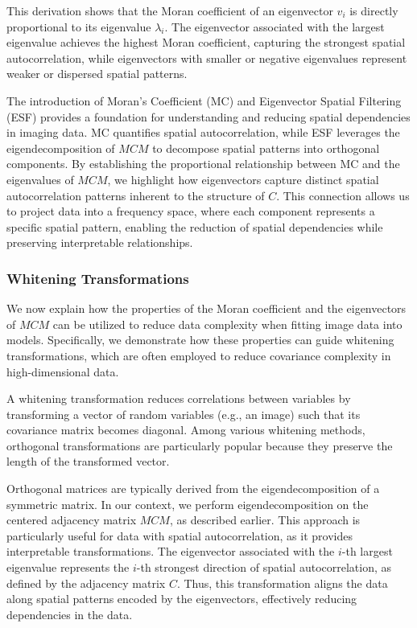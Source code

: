 \documentclass[12pt]{article}
\begin{document}
This derivation shows that the Moran coefficient of an eigenvector \( v_i \) is directly proportional to its eigenvalue \( \lambda_i \). The eigenvector associated with the largest eigenvalue achieves the highest Moran coefficient, capturing the strongest spatial autocorrelation, while eigenvectors with smaller or negative eigenvalues represent weaker or dispersed spatial patterns.

The introduction of Moran’s Coefficient (MC) and Eigenvector Spatial Filtering (ESF) provides a foundation for understanding and reducing spatial dependencies in imaging data. MC quantifies spatial autocorrelation, while ESF leverages the eigendecomposition of \( MCM \) to decompose spatial patterns into orthogonal components. By establishing the proportional relationship between MC and the eigenvalues of \( MCM \), we highlight how eigenvectors capture distinct spatial autocorrelation patterns inherent to the structure of \( C \). This connection allows us to project data into a frequency space, where each component represents a specific spatial pattern, enabling the reduction of spatial dependencies while preserving interpretable relationships.



\subsubsection{Whitening Transformations}

We now explain how the properties of the Moran coefficient and the eigenvectors of \( MCM \) can be utilized to reduce data complexity when fitting image data into models. Specifically, we demonstrate how these properties can guide whitening transformations, which are often employed to reduce covariance complexity in high-dimensional data.

A whitening transformation reduces correlations between variables by transforming a vector of random variables (e.g., an image) such that its covariance matrix becomes diagonal. Among various whitening methods, orthogonal transformations are particularly popular because they preserve the length of the transformed vector.

Orthogonal matrices are typically derived from the eigendecomposition of a symmetric matrix. In our context, we perform eigendecomposition on the centered adjacency matrix \( MCM \), as described earlier. This approach is particularly useful for data with spatial autocorrelation, as it provides interpretable transformations. The eigenvector associated with the \( i \)-th largest eigenvalue represents the \( i \)-th strongest direction of spatial autocorrelation, as defined by the adjacency matrix \( C \). Thus, this transformation aligns the data along spatial patterns encoded by the eigenvectors, effectively reducing dependencies in the data.
\end{document}
